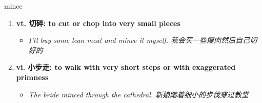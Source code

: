 
\begin{frame}
{\huge mince}
\begin{center}
\begin{enumerate}\Large
  \item \textbf{vt. 切碎: to cut or chop into very small pieces}
  \begin{itemize}
    \item \em{\Large{I'll buy some lean meat and mince it myself. 我会买一些瘦肉然后自己切好的}}
  \end{itemize}
  \item \textbf{vi. 小步走: to walk with very short steps or with exaggerated primness}
  \begin{itemize}
    \item \em{\Large{The bride minced through the cathedral. 新娘踏着细小的步伐穿过教堂}}
  \end{itemize}
\end{enumerate}
\end{center}
\end{frame}
